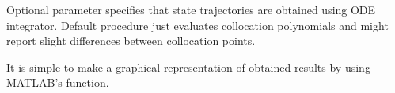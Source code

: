 Optional parameter  specifies that state trajectories are
obtained using ODE integrator. Default procedure just evaluates
collocation polynomials and might report slight differences between
collocation points. 

It is simple to make a graphical representation of obtained results by
using MATLAB's  function.



